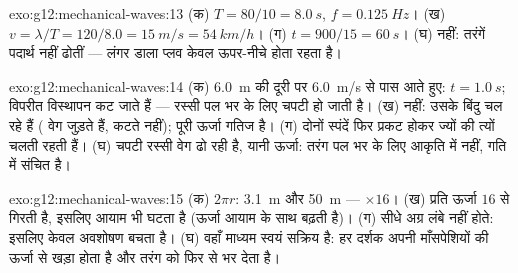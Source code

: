 \begin{solution}{exo:g12:mechanical-waves:13}
(क) $T = 80/10 = \qty{8.0}{s}$, $f = \qty{0.125}{Hz}$। (ख) $v = \lambda/T = 120/8.0 = \qty{15}{m/s} = \qty{54}{km/h}$। (ग) $t = 900/15 = \qty{60}{s}$। (घ) नहीं: तरंगें पदार्थ
नहीं ढोतीं --- लंगर डाला प्लव केवल ऊपर-नीचे होता रहता है।
\end{solution}

\begin{solution}{exo:g12:mechanical-waves:14}
(क) \qty{6.0}{m} की दूरी पर \qty{6.0}{m/s} से पास आते हुए: $t = \qty{1.0}{s}$; विपरीत विस्थापन कट जाते
हैं --- रस्सी पल भर के लिए चपटी हो जाती है। (ख) नहीं: उसके बिंदु चल रहे हैं
( वेग जुड़ते हैं, कटते नहीं); पूरी ऊर्जा गतिज है।
(ग) दोनों स्पंदें फिर प्रकट होकर ज्यों की त्यों चलती रहती हैं। (घ) चपटी रस्सी
वेग ढो रही है, यानी ऊर्जा: तरंग पल भर के लिए आकृति में नहीं,
गति में संचित है।
\end{solution}

\begin{solution}{exo:g12:mechanical-waves:15}
(क) $2\pi r$: \qty{3.1}{m} और \qty{50}{m} --- $\times 16$। (ख) प्रति 
ऊर्जा $16$ से गिरती है, इसलिए आयाम भी घटता है
(ऊर्जा आयाम के साथ बढ़ती है)। (ग) सीधे अग्र लंबे नहीं होते:
इसलिए केवल अवशोषण बचता है। (घ) वहाँ माध्यम स्वयं सक्रिय है: हर दर्शक अपनी
माँसपेशियों की ऊर्जा से खड़ा होता है और तरंग को फिर से भर
देता है।
\end{solution}

